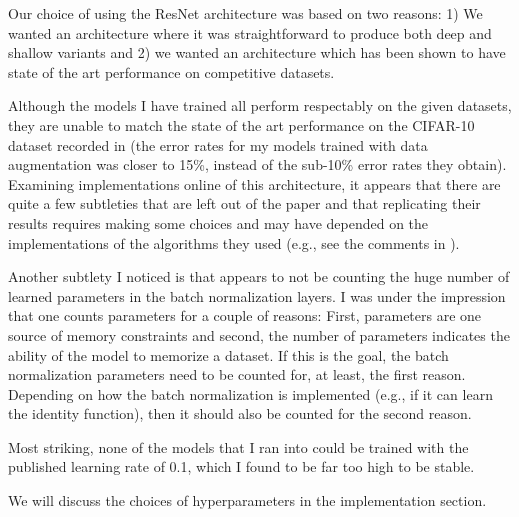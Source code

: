 \documentclass[english,a4paper,oneside]{amsart}
\theoremstyle{definition}
\begin{document}
Our choice of using the ResNet architecture was based on two  reasons: 1) We wanted an architecture where it was straightforward to produce both deep and shallow variants and 2) we wanted an architecture which has been shown to have state of the art performance on competitive datasets.

\begin{remark}\label{rem:CIFAR10}
	Although the models I have trained all perform respectably on the given datasets, they are unable to match the state of the art performance on the CIFAR-10 dataset recorded in \cite{ResNet} (the error rates for my models trained with data augmentation was closer to 15\%, instead of the sub-10\% error rates they obtain). Examining implementations online of this architecture, it appears that there are quite a few subtleties that are left out of the paper and that replicating their results requires making some choices and may have depended on the implementations of the algorithms they used (e.g., see the comments in \cite{GitResnet}). 

	Another subtlety I noticed is that \cite{ResNet} appears to not be counting the huge number of learned parameters in the batch normalization layers. I was under the impression that one counts parameters for a couple of reasons: First, parameters are one source of memory constraints and second, the number of parameters indicates the ability of the model to memorize a dataset. If this is the goal, the batch normalization parameters need to be counted for, at least, the first reason. Depending on how the batch normalization is implemented (e.g., if it can learn the identity function), then it should also be counted for the second reason. 

	Most striking, none of the models that I ran into could be trained with the published learning rate of 0.1, which I found to be far too high to be stable. 
\end{remark}
We will discuss the choices of hyperparameters in the implementation section. 


\end{document}
